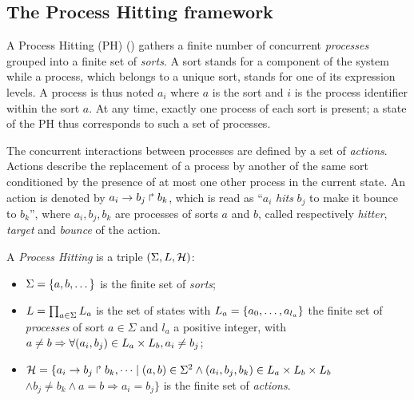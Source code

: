 \subsection{The Process Hitting framework}
\label{ssec:PH}

A Process Hitting (PH) () gathers a finite number of concurrent \emph{processes}
grouped into a finite set of \emph{sorts}.
A sort stands for a component of the system while a process, which belongs to a unique sort, stands for one of its expression levels.
A process is thus noted $a_i$ where $a$ is the sort and $i$ is the process identifier within the sort $a$.
At any time, exactly one process of each sort is present; a state of the PH thus corresponds to such a set of processes.
 
The concurrent interactions between processes are defined by a set of
\emph{actions}.
Actions describe the replacement of a process by another of the same sort
conditioned by the presence of at most one other process in the current state.
An action is denoted by $a_i\rightarrow b_j\Rsh b_k$, which is read as
``$a_i$ \emph{hits} $b_j$ to make it bounce to $b_k$'',
where $a_i,b_j,b_k$ are processes of sorts $a$ and $b$,
called respectively \emph{hitter}, \emph{target} and
\emph{bounce} of the action.

\begin{definition}\label{def:PH}
A \emph{Process Hitting} is a triple $(\Sigma,L,\mathcal{H})$:
\begin{itemize}
\item $\Sigma = \{a,b,\dots\}$ is the finite set of \emph{sorts};
\item $L = \prod_{a\in\Sigma} L_a$ is the set of states with $L_a = \{a_0,\dots,a_{l_a}\}$
the finite set of \emph{processes} of sort $a\in\Sigma$ and $l_a$ a positive integer, with
	$a\neq b\Rightarrow \forall(a_i,b_j)\in L_a\times L_b,a_i\neq b_j$;
\item $\mathcal{H} = \{ a_i\rightarrow b_j\Rsh b_k, \dots \mid
					(a,b)\in\Sigma^2 \wedge (a_i,b_j,b_k)\in L_a\times L_b\times L_b$ \\
	\hspace*{2cm} $\wedge b_j\neq b_k \wedge a=b\Rightarrow a_i=b_j\}$
			is the finite set of \emph{actions}.
\end{itemize}
\end{definition}

